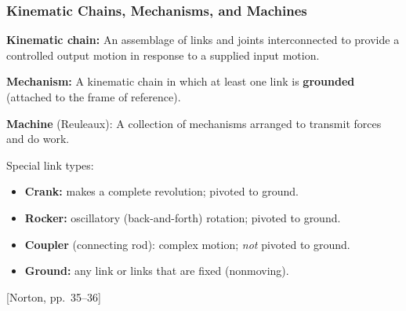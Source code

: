 \documentclass[10pt,aspectratio=43]{beamer}
\newcommand{\pref}[1]{\vfill\hfill{\scriptsize\color{gray}[Norton, pp.~#1]}}
\begin{document}
\begin{frame}
\frametitle{Kinematic Chains, Mechanisms, and Machines}

\begin{yellowbox}
\textbf{Kinematic chain:} An assemblage of links and joints interconnected to provide a controlled output motion in response to a supplied input motion.
\end{yellowbox}

\vspace{4pt}
\begin{yellowbox}
\textbf{Mechanism:} A kinematic chain in which at least one link is \textbf{grounded} (attached to the frame of reference).
\end{yellowbox}

\vspace{4pt}
\begin{yellowbox}
\textbf{Machine} (Reuleaux): A collection of mechanisms arranged to transmit forces and do work.
\end{yellowbox}

\vspace{6pt}
Special link types:
\begin{itemize}
  \item \textbf{Crank:} makes a complete revolution; pivoted to ground.
  \item \textbf{Rocker:} oscillatory (back-and-forth) rotation; pivoted to ground.
  \item \textbf{Coupler} (connecting rod): complex motion; \emph{not} pivoted to ground.
  \item \textbf{Ground:} any link or links that are fixed (nonmoving).
\end{itemize}
\pref{35--36}
\end{frame}

\end{document}
